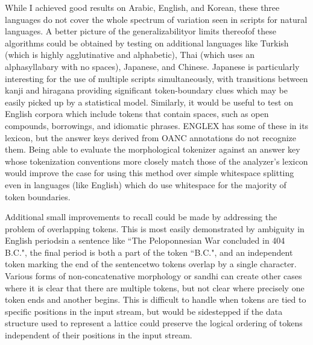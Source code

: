 While I achieved good results on Arabic, English, and Korean, these three languages do not cover the whole spectrum of variation seen in scripts for natural languages. A better picture of the generalizability\textemdash or limits thereof\textemdash of these algorithms could be obtained by testing on additional languages like Turkish (which is highly agglutinative and alphabetic), Thai (which uses an alphasyllabary with no spaces), Japanese, and Chinese. Japanese is particularly interesting for the use of multiple scripts simultaneously, with transitions between kanji and hiragana providing significant token-boundary clues which may be easily picked up by a statistical model. Similarly, it would be useful to test on English corpora which include tokens that contain spaces, such as open compounds, borrowings, and idiomatic phrases. ENGLEX has some of these in its lexicon, but the answer keys derived from OANC annotations do not recognize them. Being able to evaluate the morphological tokenizer against an answer key whose tokenization conventions more closely match those of the analyzer's lexicon would improve the case for using this method over simple whitespace splitting even in languages (like English) which do use whitespace for the majority of token boundaries.

Additional small improvements to recall could be made by addressing the problem of overlapping tokens. This is most easily demonstrated by ambiguity in English periods\textemdash in a sentence like ``The Peloponnesian War concluded in 404 B.C.", the final period is both a part of the token ``B.C.", and an independent token marking the end of the sentence\textemdash two tokens overlap by a single character. Various forms of non-concatenative morphology or sandhi can create other cases where it is clear that there are multiple tokens, but not clear where precisely one token ends and another begins. This is difficult to handle when tokens are tied to specific positions in the input stream, but would be sidestepped if the data structure used to represent a lattice could preserve the logical ordering of tokens independent of their positions in the input stream.

